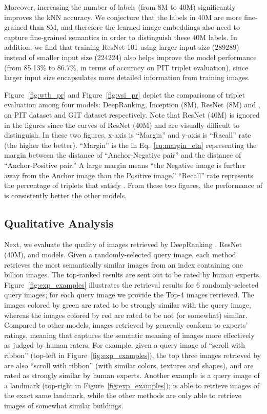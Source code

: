 \documentclass[sigconf]{acmart}
\begin{document}
Moreover, increasing the number of labels (from 8M to 40M) significantly improves the kNN accuracy. We conjecture that the labels in 40M are more fine-grained than 8M, and therefore the learned image embeddings also need to capture fine-grained semantics in order to distinguish these 40M labels. In addition, we find that training ResNet-101 using larger input size (289289) instead of smaller input size (224224) also helps improve the model performance (from 85.13\% to 86.7\%, in terms of accuracy on PIT triplet evaluation), since larger input size encapsulates more detailed information from training images.

Figure~\ref{fig:wtb_pr} and Figure~\ref{fig:vsi_pr} depict the comparisons of triplet evaluation among four models: DeepRanking, Inception (8M), ResNet (8M) and {\ourmodel}, on PIT dataset and GIT dataset respectively. Note that ResNet (40M) is ignored in the figures since the curves of ResNet (40M) and {\ourmodel} are visually difficult to distinguish. In these two figures, x-axis is ``Margin'' and y-axis is ``Racall'' rate (the higher the better). ``Margin'' is the  in Eq.~\ref{eq:margin_eta} representing the margin between the distance of ``Anchor-Negative pair'' and the distance of ``Anchor-Positive pair.'' A large margin means ``the Negative image is  further away from the Anchor image than the Positive image.'' ``Recall'' rate represents the percentage of triplets that satisfy . From these two figures, the performance of {\ourmodel} is consistently better the other models.



\subsection{Qualitative Analysis}
\label{subsec:Qualitatively Studies}


Next, we evaluate the quality of images retrieved by DeepRanking \cite{wang2014learning}, ResNet (40M), and {\ourmodel} models. Given a randomly-selected query image, each method retrieves the most semantically similar images from an index containing one billion images. The top-ranked results are sent out to be rated by human experts. Figure~\ref{fig:exp_examples} illustrates the retrieval results for 6 randomly-selected query images; for each query image we provide the Top-4 images retrieved. The images colored by green are rated to be strongly similar with the query image, whereas the images colored by red  are rated to be not (or somewhat) similar. Compared to other models, images retrieved by {\ourmodel} generally conform to experts' ratings, meaning that {\ourmodel} captures the semantic meaning of images more effectively as judged by human raters. For example, given a query image of ``scroll with ribbon'' (top-left in Figure~\ref{fig:exp_examples}), the top three  images retrieved by {\ourmodel} are also ``scroll with ribbon'' (with similar colors, textures and shapes), and are rated as strongly similar by human experts. Another example is a query image of a landmark (top-right in Figure~\ref{fig:exp_examples}); {\ourmodel} is able to retrieve images of the exact same landmark, while the other methods are only able to retrieve images of somewhat similar buildings. 
\end{document}
